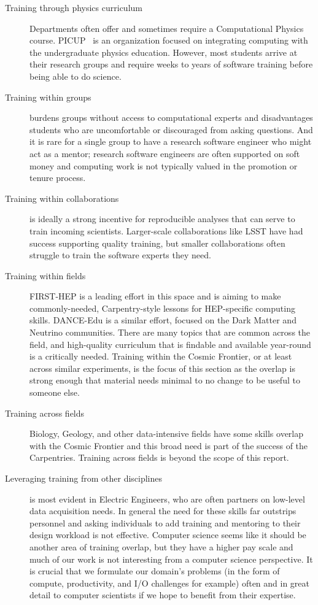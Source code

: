 \begin{description}
  \item [Training through physics curriculum] Departments often offer and sometimes require a Computational Physics course.  PICUP~\cite{Caballero2019-qj} is an organization focused on integrating computing with the undergraduate physics education.  However, most students arrive at their research groups and require weeks to years of software training before being able to do science.
  \item [Training within groups] burdens groups without access to computational experts and disadvantages students who are uncomfortable or discouraged from asking questions.  And it is rare for a single group to have a research software engineer who might act as a mentor; research software engineers are often supported on soft money and computing work is not typically valued in the promotion or tenure process.
  \item [Training within collaborations] is ideally a strong incentive for reproducible analyses that can serve to train incoming scientists.  Larger-scale collaborations like LSST have had success supporting quality training, but smaller collaborations often struggle to train the software experts they need.
  \item [Training within fields] FIRST-HEP is a leading effort in this space and is aiming to make commonly-needed, Carpentry-style lessons for HEP-specific computing skills.  DANCE-Edu is a similar effort, focused on the Dark Matter and Neutrino communities.  There are many topics that are common across the field, and high-quality curriculum that is findable and available year-round is a critically needed.  Training within the Cosmic Frontier, or at least across similar experiments, is the focus of this section as the overlap is strong enough that material needs minimal to no change to be useful to someone else.
  \item [Training across fields] Biology, Geology, and other data-intensive fields have some skills overlap with the Cosmic Frontier and this broad need is part of the success of the Carpentries.  Training across fields is beyond the scope of this report.
  \item [Leveraging training from other disciplines] is most evident in Electric Engineers, who are often partners on low-level data acquisition needs.  In general the need for these skills far outstrips personnel and asking individuals to add training and mentoring to their design workload is not effective.  Computer science seems like it should be another area of training overlap, but they have a higher pay scale and much of our work is not interesting from a computer science perspective. It is crucial that we formulate our domain's problems (in the form of compute, productivity, and I/O challenges for example) often and in great detail to computer scientists if we hope to benefit from their expertise.

\end{description}
